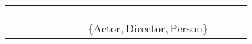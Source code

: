 \begin{table}[]
{\begin{tabular}{lllllllllll}
                          &                           &                   &                                                                          &                                                                        &                           &                                                             &                                                                            & \cellcolor[HTML]{FC8D59}  &                                 &                                                                        \\
                          &                           &                   &                                                                          &                                                                        &                           &                                                             &                                                                            &                                                                           &                                 & \cellcolor[HTML]{FC8D59} \\
                          &                           &                   & \cellcolor[HTML]{FC8D59}   &                                                                        &                           &                                                             &                                                                            &                                                                           &                                 &                                                                        \\
                          &                           &                   &                                                                          & \cellcolor[HTML]{FC8D59} &                           &                                                             &                                                                            &                                                                           &                                 &                                                                        \\
                          &                           &                   &                                                                          &                                                                        &                           &                                                             & \cellcolor[HTML]{FC8D59}$\{\text{Actor}, \text{Director}, \text{Person}\}$ &                                                                           &                                 &                                                                        \\

\end{tabular}}
\end{table}

